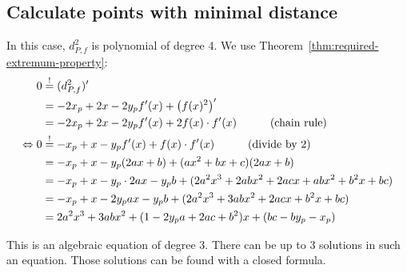 \documentclass[a4paper]{scrartcl}
\theoremstyle{break}
\theoremstyle{nonumberplain}
\begin{document}
\subsection{Calculate points with minimal distance}
In this case, $d_{P,f}^2$ is polynomial of degree 4. 
We use Theorem~\ref{thm:required-extremum-property}:\nobreak
\begin{align}
    0     &\overset{!}{=} (d_{P,f}^2)'\\
          &= -2 x_p + 2x -2y_p f'(x) + \left (f(x)^2 \right )'\\
          &= -2 x_p + 2x -2y_p f'(x) + 2 f(x) \cdot f'(x) \rlap{\hspace*{3em}(chain rule)}\label{eq:minimizingFirstDerivative}\\
\Leftrightarrow 0 &\overset{!}{=} -x_p + x -y_p f'(x) + f(x) \cdot f'(x) \rlap{\hspace*{3em}(divide by 2)}\label{eq:minimizingFirstDerivative}\\
          &= -x_p + x -y_p (2ax+b) + (ax^2+bx+c)(2ax+b)\\
          &= -x_p + x -y_p \cdot 2ax- y_p b + (2 a^2 x^3+2 a b x^2+2 a c x+ab x^2+b^2 x+bc)\\
          &= -x_p + x -2y_p ax- y_p b + (2a^2 x^3 + 3 ab x^2 + 2acx + b^2 x + bc)\\
          &= 2a^2 x^3 + 3 ab x^2 + (1 -2y_p a+ 2ac + b^2)x +(bc-by_p-x_p)
\end{align}



This is an algebraic equation of degree 3.
There can be up to 3 solutions in such an equation. Those solutions
can be found with a closed formula.

\end{document}
